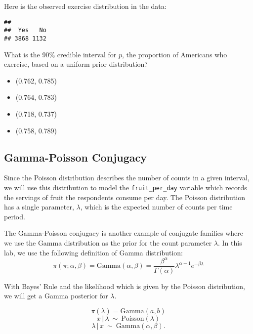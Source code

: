 \documentclass[
]{article}
\newenvironment{Shaded}{\begin{snugshade}}{\end{snugshade}}
\newcommand{\KeywordTok}[1]{\textcolor[rgb]{0.13,0.29,0.53}{\textbf{#1}}}
\newcommand{\NormalTok}[1]{#1}
\newcommand{\OperatorTok}[1]{\textcolor[rgb]{0.81,0.36,0.00}{\textbf{#1}}}
\providecommand{\tightlist}{%
  \setlength{\itemsep}{0pt}\setlength{\parskip}{0pt}}
\begin{document}
Here is the observed exercise distribution in the data:

\begin{Shaded}
\end{Shaded}

\begin{verbatim}
## 
##  Yes   No 
## 3868 1132
\end{verbatim}

What is the 90\% credible interval for \(p\), the proportion of
Americans who exercise, based on a uniform prior distribution?

\begin{itemize}
\tightlist
\item
  (0.762, 0.785)
\item
  (0.764, 0.783)
\item
  (0.718, 0.737)
\item
  (0.758, 0.789)
\end{itemize}

\hypertarget{gamma-poisson-conjugacy}{%
\subsection{Gamma-Poisson Conjugacy}\label{gamma-poisson-conjugacy}}

Since the Poisson distribution describes the number of counts in a given
interval, we will use this distribution to model the
\texttt{fruit\_per\_day} variable which records the servings of fruit
the respondents consume per day. The Poisson distribution has a single
parameter, \(\lambda\), which is the expected number of counts per time
period.

The Gamma-Poisson conjugacy is another example of conjugate families
where we use the Gamma distribution as the prior for the count parameter
\(\lambda\). In this lab, we use the following definition of Gamma
distribution:
\[ \pi(\pi; \alpha, \beta) = \text{Gamma}(\alpha, \beta) = \frac{\beta^\alpha}{\Gamma(\alpha)}\lambda^{\alpha-1}e^{-\beta\lambda}\]

With Bayes' Rule and the likelihood which is given by the Poisson
distribution, we will get a Gamma posterior for \(\lambda\).

\[ \pi(\lambda) = \text{Gamma}(a,b) \]
\[ x\,|\,\lambda ~\sim~ \text{Poisson}(\lambda) \]
\[ \lambda \,|\, x ~\sim~ \text{Gamma}(\alpha,\beta).\]
\end{document}
